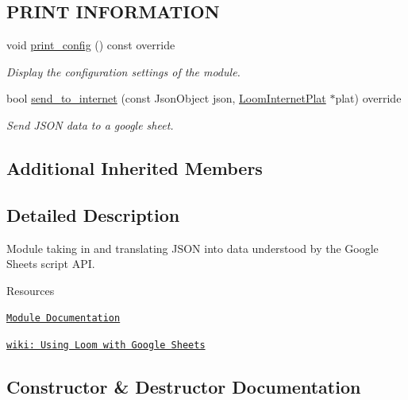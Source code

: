 \subsection*{P\+R\+I\+NT I\+N\+F\+O\+R\+M\+A\+T\+I\+ON}
\begin{DoxyCompactItemize}
\item 
void \hyperlink{class_loom___google_sheets_a83066e82b742c1f273bf7b009a1490d4}{print\+\_\+config} () const override
\begin{DoxyCompactList}\small\item\em Display the configuration settings of the module. \end{DoxyCompactList}\item 
bool \hyperlink{class_loom___google_sheets_af446a27796d495a5489543323f4cc505}{send\+\_\+to\+\_\+internet} (const Json\+Object json, \hyperlink{class_loom_internet_plat}{Loom\+Internet\+Plat} $\ast$plat) override
\begin{DoxyCompactList}\small\item\em Send J\+S\+ON data to a google sheet. \end{DoxyCompactList}\end{DoxyCompactItemize}
\subsection*{Additional Inherited Members}


\subsection{Detailed Description}
Module taking in and translating J\+S\+ON into data understood by the Google Sheets script A\+PI. 

\begin{DoxyParagraph}{Resources}

\begin{DoxyItemize}
\item \href{https://openslab-osu.github.io/Loom/html/class_loom___google_sheets.html}{\tt Module Documentation}
\item \href{https://github.com/OPEnSLab-OSU/Loom/wiki/Using-Loom-with-Google-Sheets}{\tt wiki\+: Using Loom with Google Sheets} 
\end{DoxyItemize}
\end{DoxyParagraph}


\subsection{Constructor \& Destructor Documentation}
